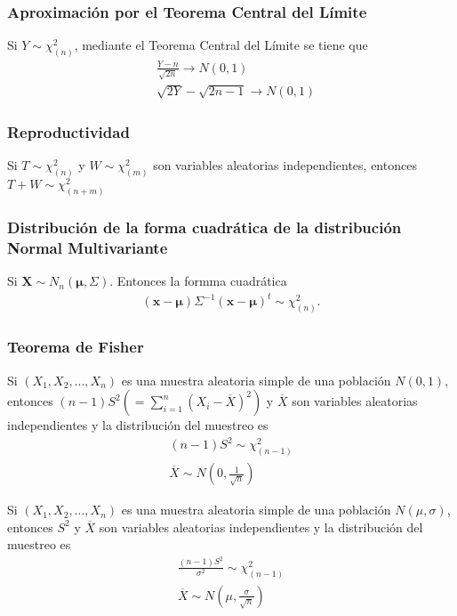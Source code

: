 \subsubsection{Aproximación por el Teorema Central del Límite}
Si $Y \sim \chi_{(n)}^2$, mediante el Teorema Central del Límite se tiene que
\begin{align*}
     & \frac{Y - n}{\sqrt{2n}} \longrightarrow N(0,1)   \\
     & \sqrt{2Y} - \sqrt{2n - 1} \longrightarrow N(0,1)
\end{align*}

\subsubsection{Reproductividad}
Si $T \sim \chi_{(n)}^2$ y $W \sim \chi_{(m)}^2$ son variables aleatorias independientes, entonces $T + W \sim \chi_{(n+m)}^2$

\subsubsection{Distribución de la forma cuadrática de la distribución Normal Multivariante}
Si $\textbf{X} \sim N_n(\boldsymbol{\mu}, \Sigma)$. Entonces la formma cuadrática
\begin{align*}
    (\textbf{x} - \boldsymbol{\mu})\Sigma^{-1}(\textbf{x} - \boldsymbol{\mu})^t \sim \chi_{(n)}^2.
\end{align*}

\subsubsection{Teorema de Fisher}

\begin{teo}
    Si $(X_1,X_2,...,X_n)$ es una muestra aleatoria simple de una población $N(0,1)$, entonces $(n-1)S^2 \left( = \sum_{i=1}^{n}{(X_i -\overline{X})^2}\right)$ y $\overline{X}$ son variables aleatorias independientes y la distribución del muestreo es
    \begin{align*}
        (n-1)S^2 \sim \chi_{(n-1)}^2 \\
        \overline{X} \sim N\left( 0, \frac{1}{\sqrt{n}} \right)
    \end{align*}
\end{teo}

\begin{teo}
    Si $(X_1,X_2,...,X_n)$ es una muestra aleatoria simple de una población $N(\mu,\sigma)$, entonces $S^2$ y $\overline{X}$ son variables aleatorias independientes y la distribución del muestreo es
    \begin{align*}
        \frac{(n-1)S^2}{\sigma^2} \sim \chi_{(n-1)}^2 \\
        \overline{X} \sim N\left( \mu, \frac{\sigma}{\sqrt{n}} \right)
    \end{align*}
\end{teo}

